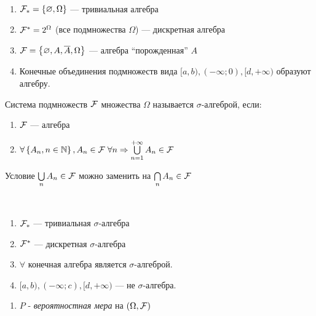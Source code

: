 \begin{example}~
	\begin{enumerate}
		\item $\mathcal{F}_* = \left\{ \varnothing, \Omega \right\}$ --- тривиальная алгебра
		\item $\mathcal{F}^* = 2^\Omega$ (все подмножества $\Omega$) --- дискретная алгебра
		\item $\mathcal{F} = \left\{ \varnothing, A, \overline{A}, \Omega \right\}$ --- алгебра ``порожденная'' $A$
		\item Конечные объединения подмножеств вида 
					$[a, b), (-\infty; 0), [d, +\infty)$ образуют алгебру.\\
	\end{enumerate}
\end{example}

\begin{definition}
	Система подмножеств $\mathcal{F}$ множества $\Omega$ называется $\sigma$-алгеброй, если:
	\begin{enumerate}
		\item $\mathcal{F}$ --- алгебра
		\item $\forall \left\{ A_n, n \in \mathbb{N} \right\}, A_n \in \mathcal{F} \; \forall n 
					\Rightarrow \bigcup\limits_{n = 1}^{+\infty} A_n \in \mathcal{F}$\\
	\end{enumerate}
\end{definition}

\begin{exercise}
	Условие $\bigcup\limits_n A_n \in \mathcal{F}$ можно заменить на $\bigcap\limits_n A_n \in \mathcal{F}$
\end{exercise}

\begin{example}~
	\begin{enumerate}
		\item $\mathcal{F}_* $ --- тривиальная $\sigma$-алгебра
		\item $\mathcal{F}^* $ --- дискретная $\sigma$-алгебра
		\item $\forall$ конечная алгебра является $\sigma$-алгеброй.
		\item $[a, b), (-\infty; c), [d, +\infty)$ --- не $\sigma$-алгебра.\\
	\end{enumerate}
\end{example}

\begin{enumerate}[resume*=kolm_triple]
	\item
		$P$ - \emph{вероятностная мера} на $(\Omega, \mathcal{F})$
\end{enumerate}

